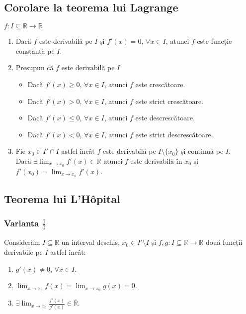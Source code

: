 \subsection*{Corolare la teorema lui Lagrange}
$f: I \subseteq \mathbb{R} \rightarrow \mathbb{R}$
\begin{enumerate}[label=\emph{\arabic*})]
	\item Dacă $f$ este derivabilă pe $I$ și $f'(x) = 0$, $\forall x \in I$, atunci $f$ este funcție constantă pe $I$.
	\item Presupun că $f$ este derivabilă pe $I$ \\
	\begin{itemize}
		\item Dacă $f'(x) \geq 0$, $\forall x \in I$, atunci $f$ este crescătoare.
		\item Dacă $f'(x) > 0$, $\forall x \in I$, atunci $f$ este strict crescătoare.
		\item Dacă $f'(x) \leq 0$, $\forall x \in I$, atunci $f$ este descrescătoare.
		\item Dacă $f'(x) < 0$, $\forall x \in I$, atunci $f$ este strict descrescătoare.
	\end{itemize}
	\item Fie $x_{0} \in I' \cap I$ astfel încât $f$ este derivabilă pe $I \setminus \{x_{0}\}$ și continuă pe $I$.\\
	Dacă $\exists \displaystyle\lim_{x \rightarrow x_{0}} f'(x) \in \mathbb{R}$ atunci $f$ este derivabilă în $x_{0}$ și $f'(x_{0}) = \displaystyle\lim_{x \rightarrow x_{0}}f'(x)$.  
\end{enumerate}

\subsection{Teorema lui L'Hôpital}

\subsubsection{Varianta $\displaystyle\frac{0}{0}$}
Considerăm $I \subseteq \mathbb{R}$ un interval deschis, $x_{0} \in I' \setminus I$ și $f, g: I \subseteq \mathbb{R} \rightarrow \mathbb{R}$ două funcții derivabile pe $I$ astfel încât: \\

\begin{enumerate}[label=\emph{\arabic*})]
	\item $g'(x) \neq 0$, $\forall x \in I$.
	\item $\displaystyle\lim_{x \rightarrow x_{0}}f(x) = \displaystyle\lim_{x \rightarrow x_{0}}g(x) = 0$.
	\item $\exists \displaystyle\lim_{x \rightarrow x_{0}} \displaystyle\frac{f'(x)}{g'(x)} \in \bar{\mathbb{R}}$.
\end{enumerate}

